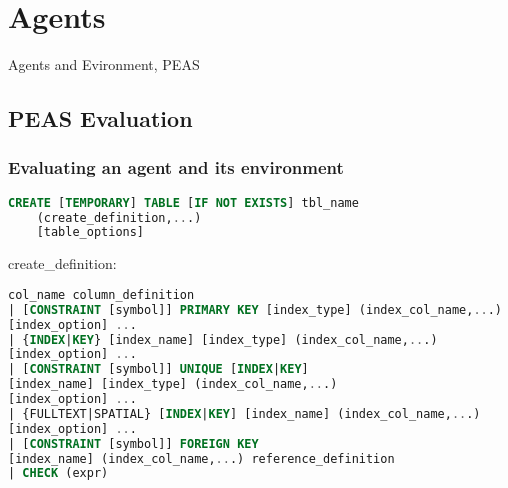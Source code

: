 \section{Agents}
Agents and Evironment, PEAS

\subsection*{PEAS Evaluation}
\subsubsection*{Evaluating an agent and its environment}
\begin{lstlisting}[language=SQL]
CREATE [TEMPORARY] TABLE [IF NOT EXISTS] tbl_name
    (create_definition,...)
    [table_options]
\end{lstlisting}

create\_definition:

\begin{lstlisting}[language=SQL]
col_name column_definition
| [CONSTRAINT [symbol]] PRIMARY KEY [index_type] (index_col_name,...)
[index_option] ...
| {INDEX|KEY} [index_name] [index_type] (index_col_name,...)
[index_option] ...
| [CONSTRAINT [symbol]] UNIQUE [INDEX|KEY]
[index_name] [index_type] (index_col_name,...)
[index_option] ...
| {FULLTEXT|SPATIAL} [INDEX|KEY] [index_name] (index_col_name,...)
[index_option] ...
| [CONSTRAINT [symbol]] FOREIGN KEY
[index_name] (index_col_name,...) reference_definition
| CHECK (expr)
\end{lstlisting}